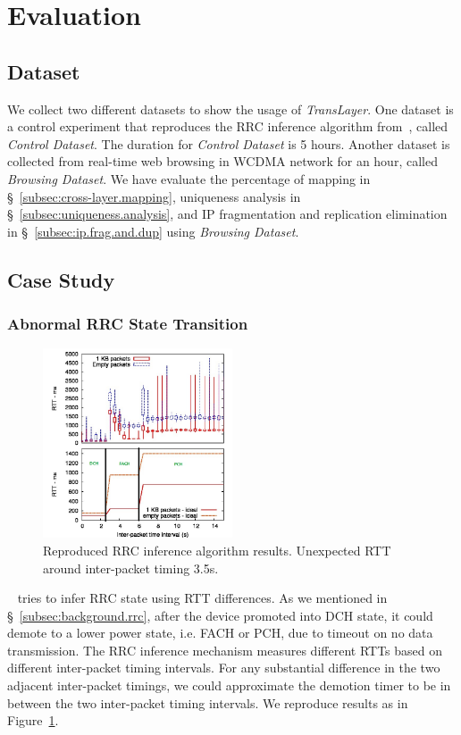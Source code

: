 \section{Evaluation}
\label{sec:eval}

\subsection{Dataset}
\label{subsec:dataset}
We collect two different datasets to show the usage of \textit{TransLayer}. One dataset is a control experiment that reproduces the RRC inference algorithm from~\cite{3g_rrc}, called \emph{Control Dataset}. The duration for \emph{Control Dataset} is 5 hours. Another dataset is collected from real-time web browsing in WCDMA network for an hour, called \emph{Browsing Dataset}.  We have evaluate the percentage of mapping in \S~\ref{subsec:cross-layer.mapping}, uniqueness analysis in \S~\ref{subsec:uniqueness.analysis}, and IP fragmentation and replication elimination in \S~\ref{subsec:ip.frag.and.dup} using \emph{Browsing Dataset}.

\subsection{Case Study}
\label{subsec:case.study}
\subsubsection{Abnormal RRC State Transition}

\begin{figure}[t!]
\centering
\includegraphics[width=0.5\textwidth]{figs/rrc_inference_result.jpg}
\caption{Reproduced RRC inference algorithm results. Unexpected RTT around inter-packet timing 3.5s.} 
\label{fig:rrc.reproduce}
\end{figure}

~\cite{3g_rrc} tries to infer RRC state using RTT differences. As we mentioned in \S~\ref{subsec:background.rrc}, after the device promoted into DCH state, it could demote to a lower power state, i.e. FACH or PCH, due to timeout on no data transmission. The RRC inference mechanism measures different RTTs based on different inter-packet timing intervals. For any substantial difference in the two adjacent inter-packet timings, we could approximate the demotion timer to be in between the two inter-packet timing intervals. We reproduce results as in Figure~\ref{fig:rrc.reproduce}.

